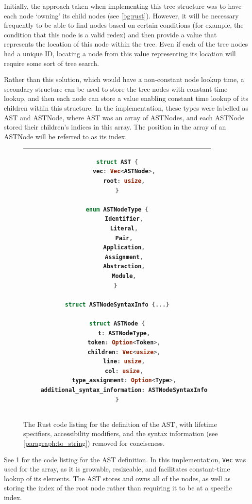 Initially, the approach taken when implementing this tree structure was to have each node `owning' its child nodes (see \ref{bg:rust}). However, it will be necessary frequently to be able to find nodes based on certain conditions (for example, the condition that this node is a valid redex) and then provide a value that represents the location of this node within the tree. Even if each of the tree nodes had a unique ID, locating a node from this value representing its location will require some sort of tree search.

Rather than this solution, which would have a non-constant node lookup time, a secondary structure can be used to store the tree nodes with constant time lookup, and then each node can store a value enabling constant time lookup of its children within this structure. In the implementation, these types were labelled as AST and ASTNode, where AST was an array of ASTNodes, and each ASTNode stored their children's indices in this array. The position in the array of an ASTNode will be referred to as its index.

\begin{figure}[t]
    \centering
    \begin{tabular}{|c|}
    \hline
    \begin{lstlisting}[language=Rust]
struct AST {
    vec: Vec<ASTNode>,
    root: usize,
}

enum ASTNodeType {
    Identifier,
    Literal,
    Pair,
    Application,
    Assignment,
    Abstraction,
    Module,
} 

struct ASTNodeSyntaxInfo {...}

struct ASTNode {
    t: ASTNodeType,
    token: Option<Token>,
    children: Vec<usize>,
    line: usize,
    col: usize,
    type_assignment: Option<Type>,
    additional_syntax_information: ASTNodeSyntaxInfo
}
    \end{lstlisting}
    \\\hline
    \end{tabular}
    \caption{The Rust code listing for the definition of the AST, with lifetime specifiers, accessibility modifiers, and the syntax information (see \ref{paragraph:to_string}) removed for conciseness.}
    \label{fig:ast_lst}
\end{figure}

See \ref{fig:ast_lst} for the code listing for the AST definition. In this implementation, \verb|Vec| was used for the array, as it is growable, resizeable, and facilitates constant-time lookup of its elements. The AST stores and owns all of the nodes, as well as storing the index of the root node rather than requiring it to be at a specific index. 

